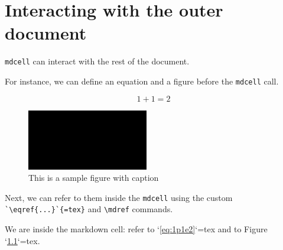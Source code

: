 \documentclass[oneside]{book}
\begin{document}
\chapter{Interacting with the outer document}

\texttt{mdcell} can interact with the rest of the document.

For instance, we can define an equation and a figure before the \texttt{mdcell} call.

\begin{equation}
1 + 1 = 2
\label{eq:1p1e2}
\end{equation}

\begin{figure}
\centering
\includegraphics[width=0.5\linewidth]{images/fail_image_verification.png}
\caption{This is a sample figure with caption}
\label{fig:black}
\end{figure}

Next, we can refer to them inside the \texttt{mdcell} using the custom \verb|`\eqref{...}`{=tex}| and \verb|\mdref| commands.

\begin{mdcell}
We are inside the markdown cell: refer to `\eqref{eq:1p1e2}`{=tex} and to Figure `\ref{fig:black}`{=tex}.
\end{mdcell}
\end{document}
